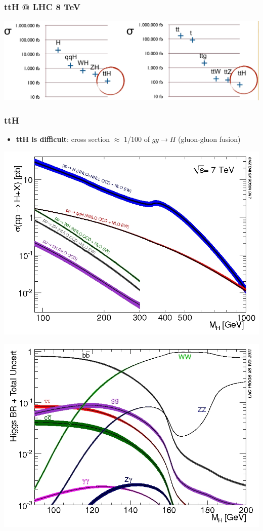 \documentclass[9pt, xcolor=dvipsnames]{beamer}
\begin{document}
\begin{frame}
 \frametitle{ttH @ LHC 8 TeV}
\begin{center}
\includegraphics[scale=0.25]{sigma}
\end{center}
\end{frame}


\begin{frame}
 \frametitle{ttH}
\begin{itemize}
 \item \textbf{ttH is difficult}: cross section $\approx$ 1/100 of $gg\rightarrow H$ (gluon-gluon fusion)
\end{itemize}
\begin{minipage}{.45\columnwidth}
 \includegraphics[scale=0.26]{Higgsxs}
\end{minipage}
\begin{minipage}{.45\columnwidth}
 \includegraphics[scale=0.26]{br}

\end{minipage}
\end{frame}
\end{document}
